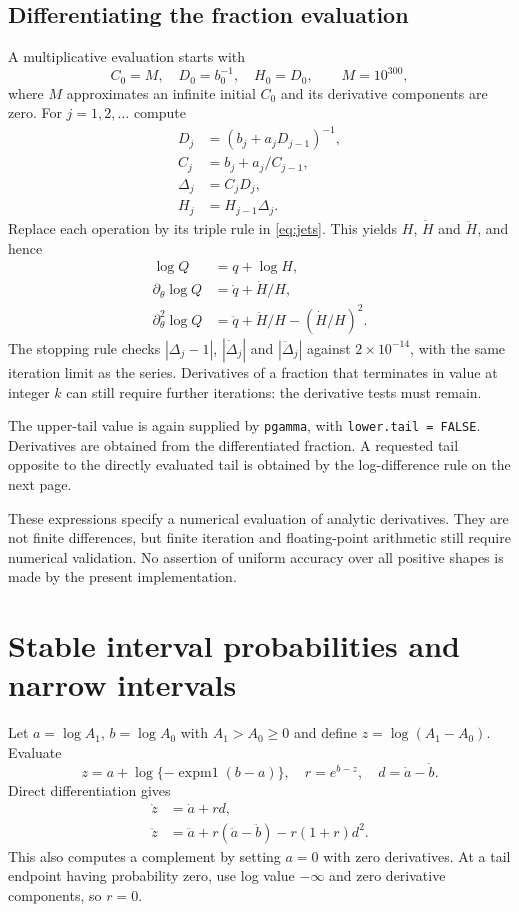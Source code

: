 \documentclass[11pt,a4paper]{article}
\newcommand{\code}[1]{\texttt{#1}}
\begin{document}
\subsection{Differentiating the fraction evaluation}
A multiplicative evaluation starts with
\[
 C_0=M,\quad D_0=b_0^{-1},\quad H_0=D_0,\qquad M=10^{300},
\]
where $M$ approximates an infinite initial $C_0$ and its derivative components
are zero. For $j=1,2,\ldots$ compute
\begin{align}
 D_j&=(b_j+a_jD_{j-1})^{-1},\\
 C_j&=b_j+a_j/C_{j-1},\\
 \Delta_j&=C_jD_j,\\
 H_j&=H_{j-1}\Delta_j.
 \label{eq:cfalgorithm}
\end{align}
Replace each operation by its triple rule in \eqref{eq:jets}. This yields
$H$, $\dot H$ and $\ddot H$, and hence
\begin{align}
 \log Q&=q+\log H,\\
 \partial_\theta\log Q&=\dot q+\dot H/H,\\
 \partial_\theta^2\log Q&=\ddot q+\ddot H/H-(\dot H/H)^2.
 \label{eq:cfderivs}
\end{align}
The stopping rule checks $|\Delta_j-1|$, $|\dot\Delta_j|$ and
$|\ddot\Delta_j|$ against $2\times10^{-14}$, with the same iteration limit
as the series. Derivatives of a fraction that terminates in value at integer
$k$ can still require further iterations: the derivative tests must remain.

The upper-tail value is again supplied by \code{pgamma}, with
\code{lower.tail = FALSE}. Derivatives are obtained from the differentiated
fraction. A requested tail opposite to the directly evaluated tail is
obtained by the log-difference rule on the next page.

These expressions specify a numerical evaluation of analytic derivatives.
They are not finite differences, but finite iteration and floating-point
arithmetic still require numerical validation. No assertion of uniform
accuracy over all positive shapes is made by the present implementation.

\newpage
\section{Stable interval probabilities and narrow intervals}
\label{sec:narrow}
Let $a=\log A_1$, $b=\log A_0$ with $A_1>A_0\geq0$ and define
$z=\log(A_1-A_0)$. Evaluate
\begin{equation}
 z=a+\log\{-\operatorname{expm1}(b-a)\},\quad
 r=e^{b-z},\quad d=\dot a-\dot b.
\end{equation}
Direct differentiation gives
\begin{align}
 \dot z&=\dot a+rd,\\
 \ddot z&=\ddot a+r(\ddot a-\ddot b)-r(1+r)d^2.
 \label{eq:logdiff}
\end{align}
This also computes a complement by setting $a=0$ with zero derivatives.
At a tail endpoint having probability zero, use log value $-\infty$ and
zero derivative components, so $r=0$.
\end{document}

